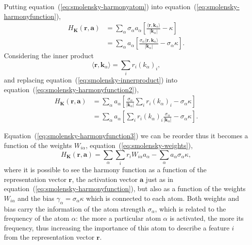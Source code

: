 Putting equation~(\ref{eq:smolensky-harmonyatom}) into equation~(\ref{eq:smolensky-harmonyfunction}),
\begin{equation}
  \label{eq:smolensky-harmonyfunction2}
  \begin{split}
      H_{\mathbf{K}}(\mathbf{r}, \mathbf{a}) & =  \sum_{\alpha} \sigma_{\alpha} a_{\alpha} \left[ \frac{\langle \mathbf{r}, \mathbf{k}_{\alpha} \rangle}{|\mathbf{k}_{\alpha}|} - \kappa \right] \\
      & = \sum_{\alpha} a_{\alpha} \left[ \frac{\sigma_{\alpha} \langle \mathbf{r}, \mathbf{k}_{\alpha} \rangle}{|\mathbf{k}_{\alpha}|} - \sigma_{\alpha} \kappa \right].
  \end{split}
 \end{equation}
Considering the inner product
\begin{equation}
    \label{eq:smolensky-innerproduct}
    \langle \mathbf{r}, \mathbf{k}_{\alpha} \rangle = \sum_{i} r_{i} {\left( k_{\alpha} \right)}_{i},
\end{equation}
and replacing equation~(\ref{eq:smolensky-innerproduct}) into equation~(\ref{eq:smolensky-harmonyfunction2}),
\begin{equation}
  \label{eq:smolensky-harmonyfunction3}
  \begin{split}
      H_{\mathbf{K}}(\mathbf{r}, \mathbf{a}) & = \sum_{\alpha} a_{\alpha} \left[ \frac{\sigma_{\alpha}}{|\mathbf{k}_{\alpha}|}  \sum_{i} r_{i} {\left( k_{\alpha} \right)}_{i} - \sigma_{\alpha} \kappa \right] \\
  & = \sum_{\alpha} a_{\alpha} \left[ \sum_{i} r_{i} {\left( k_{\alpha} \right)}_{i} \frac{\sigma_{\alpha}}{|\mathbf{k}_{\alpha}|} - \sigma_{\alpha} \kappa \right].
  \end{split}
\end{equation}

Equation~(\ref{eq:smolensky-harmonyfunction3}) we can be reorder thus it becomes a function of the weights $W_{i \alpha}$, equation~(\ref{eq:smolensky-weights}),
\begin{equation}
    \label{eq:smolensky-harmonyfunctionfinal}
    H_{\mathbf{K}}(\mathbf{r}, \mathbf{a}) = \sum_{\alpha} \sum_{i} r_{i} W_{i \alpha} a_{\alpha} - \sum_{\alpha} a_{\alpha} \sigma_{\alpha} \kappa,
\end{equation}
where it is possible to see the harmony function as a function of the representation vector $\mathbf{r}$, the activation vector $\mathbf{a}$ just as in equation~(\ref{eq:smolensky-harmonyfunction}), but also as a function of the weights $W_{i \alpha}$ and the bias $\gamma_{\alpha} = \sigma_{\alpha} \kappa$ which is connected to each atom.
Both weights and bias carry the information of the atom strength $\sigma_{\alpha}$, which is related to the frequency of the atom $\alpha$: the more a particular atom $\alpha$ is activated, the more its frequency, thus increasing the importance of this atom to describe a feature $i$ from the representation vector $\mathbf{r}$.


